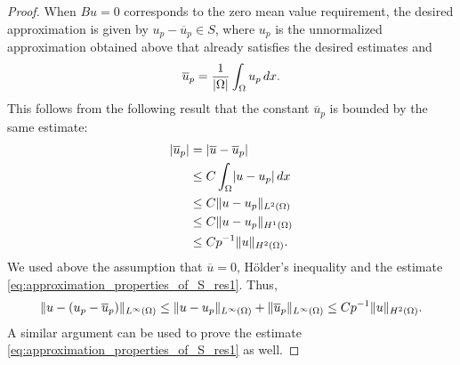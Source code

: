 \documentclass[english, 12pt, a4paper, sci, utf8, a-2b, online]{aaltothesis}
\theoremstyle{definition}
\theoremstyle{plain}
\DeclarePairedDelimiter\abs{\lvert}{\rvert}
\DeclarePairedDelimiter\norm{\lVert}{\rVert}
\newcommand*\diff{\mathop{}\!d}
\numberwithin{equation}{section}
\begin{document}
\begin{proof}
    When $Bu = 0$ corresponds to the zero mean value requirement,
    the desired approximation is given by $u_p - \overline{u}_p \in S$, where
    $u_p$ is the unnormalized approximation obtained above that already satisfies the desired
    estimates and
    \begin{equation*}
        \overline{u}_p = \frac{1}{\abs{\Omega}} \int_{\Omega} u_p \diff x.
    \end{equation*}
    This follows from the following result that the constant $\overline{u}_p$
    is bounded by the same estimate:
    \begin{align*}
        \abs{\overline{u}_p}
        &= \abs{\overline{u} - \overline{u}_p} \\
        &\leq C \int_{\Omega} \abs{u - u_p} \diff x \\
        &\leq C \norm{u - u_p}_{L^2(\Omega)} \\
        &\leq C \norm{u - u_p}_{H^1(\Omega)} \\
        &\leq C p^{-1} \norm{u}_{H^2(\Omega)}.
    \end{align*}
    We used above the assumption that $\overline{u} = 0$, Hölder's inequality and
    the estimate \eqref{eq:approximation_properties_of_S_res1}. Thus,
    \begin{equation*}
        \norm{u - (u_p - \overline{u}_p)}_{L^{\infty}(\Omega)}
        \leq \norm{u - u_p}_{L^{\infty}(\Omega)} + \norm{\overline{u}_p}_{L^{\infty}(\Omega)}
        \leq C p^{-1} \norm{u}_{H^2(\Omega)}.
    \end{equation*}
    A similar argument can be used to prove
    the estimate \eqref{eq:approximation_properties_of_S_res1} as well.
\end{proof}
\end{document}
